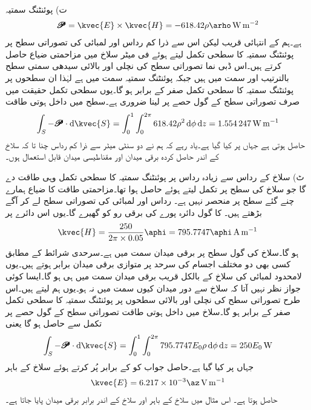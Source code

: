 ت) پوئنٹنگ سمتیہ
\begin{align*}
\pmb{\mathscr{P}}=\kvec{E} \times \kvec{H}=-618.42 \rho \arho \, \si{\watt\per\meter\squared}
\end{align*}
 ہے۔ہم  کے انتہائی قریب لیکن اس سے ذرا کم رداس اور  لمبائی کی تصوراتی سطح پر پوئنٹنگ سمتیہ کا سطحی تکمل لیتے ہوئے فی میٹر سلاخ میں مزاحمتی ضیاع حاصل کرتے ہیں۔اس ڈبی نما تصوراتی سطح کی نچلی اور بالائی سیدھی سمتی سطح بالترتیب  اور  سمت میں ہیں جبکہ پوئنٹنگ سمتیہ  سمت میں ہے لہٰذا ان سطحوں پر پوئنٹنگ سمتیہ  کا سطحی تکمل صفر کے برابر ہو گا۔یوں سطحی تکمل حقیقت میں صرف تصوراتی سطح کے گول حصے پر لینا ضروری ہے۔سطح میں داخل ہوتی طاقت 
\begin{align*}
\int_S -\pmb{\mathscr{P}} \cdot \dif \kvec{S} =\int_{0}^{1} \int_{0}^{2\pi} 618.42 \rho^2 \dif \phi \dif z=\SI{1.554247}{\watt\per\meter}
\end{align*}
حاصل ہوتی ہے جہاں  پر کیا گیا ہے۔یاد رہے کہ ہم نے دو سنٹی میٹر سے ذرا کم رداس چنا تا کہ سلاخ کے اندر حاصل کردہ برقی میدان اور مقناطیسی میدان قابل استعمال ہوں۔

ٹ) سلاخ کے رداس سے زیادہ رداس پر پوئنٹنگ سمتیہ کا سطحی تکمل وہی طاقت دے گا جو سلاخ کی سطح پر تکمل لیتے ہوئے حاصل ہوا تھا۔مزاحمتی طاقت کا ضیاع ہمارے چنے گئے سطح پر منحصر نہیں ہے۔  رداس اور  لمبائی کی تصوراتی سطح لے کر آگے بڑھتے ہیں۔ کا گول دائرہ پورے  کی برقی رو کو گھیرے گا۔یوں اس دائرے پر 
\begin{align*}
\kvec{H}=\frac{250}{2\pi \times 0.05} \aphi=795.7747 \aphi \, \si{\ampere\per\meter}
\end{align*}
ہو گا۔سلاخ کی گول سطح پر برقی میدان  سمت میں ہے۔سرحدی شرائط کے مطابق کسی بھی دو مختلف اجسام کی سرحد پر متوازی برقی میدان برابر ہوتے ہیں۔یوں لامحدود لمبائی کی سلاخ کے بالکل قریب برقی میدان  سمت میں ہی ہو گا۔ایسا کوئی جواز نظر نہیں آتا کہ سلاخ سے دور میدان کیوں  سمت میں نہ ہو۔یوں ہم  لیتے ہیں۔اس طرح تصوراتی سطح کی نچلی اور بالائی سطحوں پر پوئنٹنگ سمتیہ کا سطحی تکمل صفر کے برابر ہو گا۔سلاخ میں داخل ہوتی طاقت  تصوراتی سطح کے گول حصے پر تکمل سے حاصل ہو گا یعنی
 \begin{align*}
\int_S -\pmb{\mathscr{P}} \cdot \dif \kvec{S} =\int_{0}^{1} \int_{0}^{2\pi} 795.7747 E_0 \rho \dif \phi \dif z=250 E_0 \, \si{\watt}
\end{align*}
جہاں  پر کیا گیا ہے۔حاصل جواب کو  کے برابر پُر کرتے ہوئے سلاخ کے باہر
\begin{align*}
\kvec{E}=6.217 \times 10^{-3} \az \, \si{\volt\per\meter}
\end{align*}
حاصل ہوتا ہے۔ اس مثال میں سلاخ کے باہر اور سلاخ کے اندر برابر برقی میدان پایا جاتا ہے۔

